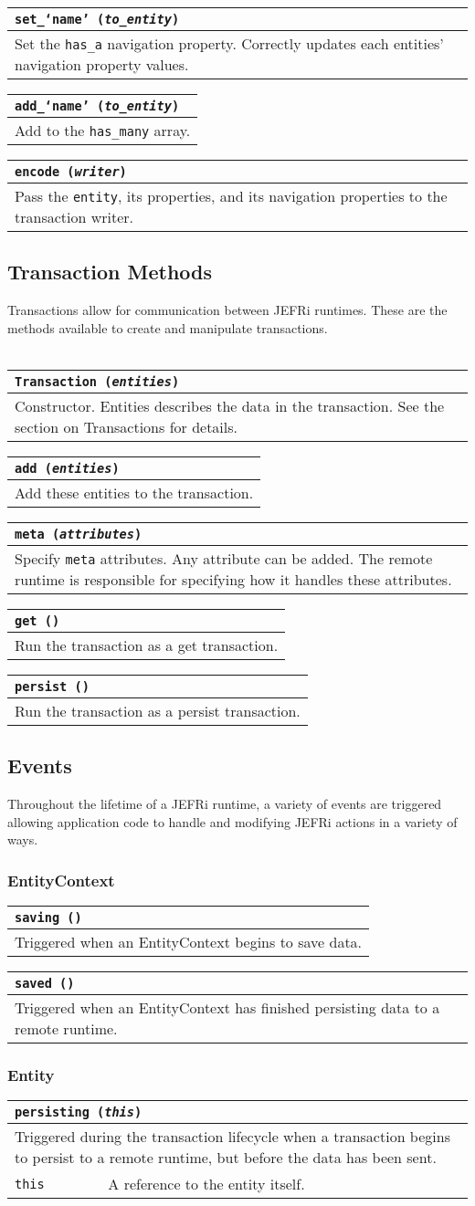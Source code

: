 \documentclass{article}
\newcommand{\ilcode}{\tt}
\newcommand{\method}[4]{
	\noindent
	\begin{tabular}{ | l | p{5in} | }
	\hline
	\multicolumn{2}{|l|}{\large \ilcode #1 ({\it #2})} \\
	\hline
	\multicolumn{2}{|p{6in}|}{#3} \\
	\hline
	#4
	\end{tabular}
}
\newcommand{\param}[2]{
	{\ilcode #1} & #2 \\
	\hline
}
\newcommand{\event}[4]{\method{#1}{#2}{#3}{#4}}
\begin{document}
\method{set\_`name'}{to\_entity}
	{Set the {\ilcode has\_a} navigation property. Correctly updates
			each entities' navigation property values.}{}

\method{add\_`name'}{to\_entity}
	{Add to the {\ilcode has\_many} array.}{}

\method{encode}{writer}
	{Pass the {\ilcode entity}, its properties, and its navigation properties to
		the	transaction writer.}
	{}

\subsection{Transaction Methods}
Transactions allow for communication between JEFRi runtimes. These are the
methods available to create and manipulate transactions.
\\
\\
\method{Transaction}{entities}
	{Constructor. Entities describes the data in the transaction. See the
			section on Transactions for details.}{}

\method{add}{entities}
	{Add these entities to the transaction.}{}

\method{meta}{attributes}
	{Specify {\ilcode meta} attributes. Any attribute can be added. The remote
	runtime is responsible for specifying how it handles these attributes.}{}

\method{get}{}
	{Run the transaction as a get transaction.}{}

\method{persist}{}
	{Run the transaction as a persist transaction.}{}

\subsection{Events}
Throughout the lifetime of a JEFRi runtime, a variety of events are triggered
allowing application code to handle and modifying JEFRi actions in a variety of
ways.

\subsubsection{EntityContext}
\event{saving}{}
	{Triggered when an EntityContext begins to save data.}
	{}

\event{saved}{}
	{Triggered when an EntityContext has finished persisting data to a remote
	runtime.}
	{}

\subsubsection{Entity}
\event{persisting}{this}
	{Triggered during the transaction lifecycle when a transaction begins to
	persist to a remote runtime, but before the data has been sent.}
	{\param{this}{A reference to the entity itself.}}
\end{document}
